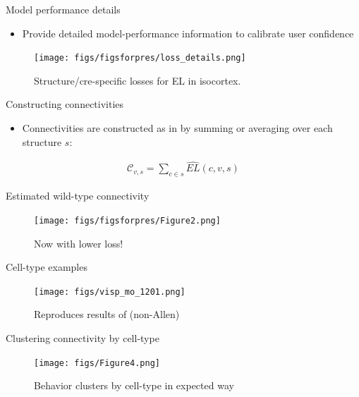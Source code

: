 \documentclass{beamer}
\begin{document}
\begin{frame}{Model performance details}
\begin{itemize}
    \item Provide detailed model-performance information to calibrate user confidence
\end{itemize}
\begin{figure}
    \centering
    \texttt{[image: figs/figsforpres/loss\_details.png]}
    \caption{Structure/cre-specific losses for EL in isocortex.}
    \label{fig:my_label}
\end{figure}
\end{frame}

\begin{frame}{Constructing connectivities}

\begin{itemize}
    \item Connectivities are constructed as in \citeauthor{Knox2019-ot} by summing or averaging over each structure $s$:
\end{itemize}
\begin{eqnarray*}
\mathcal C_{v,s} = \sum_{c \in s} \widehat{EL} (c,v,s)
\end{eqnarray*}
\end{frame}

\begin{frame}{Estimated wild-type connectivity}
\begin{figure}[H]
    \centering
    \texttt{[image: figs/figsforpres/Figure2.png]}
    \caption{Now with lower loss!}
    \label{fig:my_label}
\end{figure}
\end{frame}

\begin{frame}{Cell-type examples}

\begin{figure}
    \centering
    \texttt{[image: figs/visp\_mo\_1201.png]}
    \caption{Reproduces results of \citet{Jeong2016-dc} (non-Allen)}
    \label{fig:my_label}
\end{figure}
\end{frame}

\begin{frame}{Clustering connectivity by cell-type}
\begin{figure}
    \centering
    \texttt{[image: figs/Figure4.png]}
    \caption{Behavior clusters by cell-type in expected way}
    \label{fig:my_label}
\end{figure}
\end{frame}
\end{document}
